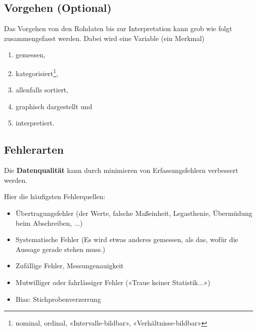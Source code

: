 \subsection{Vorgehen (Optional)}
Das Vorgehen von den Rohdaten bis zur Interpretation kann grob wie folgt zusammengefasst werden. Dabei wird eine Variable (ein Merkmal)
\begin{enumerate}
\item gemessen,
\item kategorisiert\footnote{nominal, ordinal, «Intervalle-bildbar»,
    «Verhältnisse-bildbar»},
\item allenfalls sortiert,
\item graphisch dargestellt und
\item interpretiert.
\end{enumerate}
\newpage


\subsection{Fehlerarten}


Die \textbf{Datenqualität} kann durch minimieren
von Erfassungsfehlern verbessert werden.

Hier die häufigsten Fehlerquellen:


\begin{itemize}
  
\item Übertragungsfehler (der Werte, \zB falsche Maßeinheit,
  Legasthenie, Übermüdung beim Abschreiben, ...)

\item Systematische Fehler (Es wird etwas anderes gemessen, als das,
  wofür die Aussage gerade stehen muss.)

\item Zufällige Fehler, Messungenauigkeit

\item Mutwilliger oder fahrlässiger Fehler («Traue keiner Statistik...»)

\item Bias: Stichprobenverzerrung
\end{itemize}

\newpage
